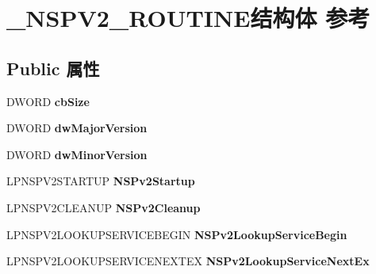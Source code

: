 \hypertarget{struct___n_s_p_v2___r_o_u_t_i_n_e}{}\section{\+\_\+\+N\+S\+P\+V2\+\_\+\+R\+O\+U\+T\+I\+N\+E结构体 参考}
\label{struct___n_s_p_v2___r_o_u_t_i_n_e}
\subsection*{Public 属性}
\begin{DoxyCompactItemize}
\item 
\mbox{\label{struct___n_s_p_v2___r_o_u_t_i_n_e_aafe88a730385e61a71c4a03383368849}} 
D\+W\+O\+RD {\bfseries cb\+Size}
\item 
\mbox{\label{struct___n_s_p_v2___r_o_u_t_i_n_e_a0ab9e8803d8e6dad01e350045e663df3}} 
D\+W\+O\+RD {\bfseries dw\+Major\+Version}
\item 
\mbox{\label{struct___n_s_p_v2___r_o_u_t_i_n_e_add448b1c3071c67d12e9fe834e958ad3}} 
D\+W\+O\+RD {\bfseries dw\+Minor\+Version}
\item 
\mbox{\label{struct___n_s_p_v2___r_o_u_t_i_n_e_affac485393d267295349378e0fc4fdf5}} 
L\+P\+N\+S\+P\+V2\+S\+T\+A\+R\+T\+UP {\bfseries N\+S\+Pv2\+Startup}
\item 
\mbox{\label{struct___n_s_p_v2___r_o_u_t_i_n_e_adaf12e9a4f58b9f37edda33e826f18d7}} 
L\+P\+N\+S\+P\+V2\+C\+L\+E\+A\+N\+UP {\bfseries N\+S\+Pv2\+Cleanup}
\item 
\mbox{\label{struct___n_s_p_v2___r_o_u_t_i_n_e_a9d6a8f99b429a5a5616d408ea8eac816}} 
L\+P\+N\+S\+P\+V2\+L\+O\+O\+K\+U\+P\+S\+E\+R\+V\+I\+C\+E\+B\+E\+G\+IN {\bfseries N\+S\+Pv2\+Lookup\+Service\+Begin}
\item 
\mbox{\label{struct___n_s_p_v2___r_o_u_t_i_n_e_a62312b8dbcb303e741c1137a85d5a9d4}} 
L\+P\+N\+S\+P\+V2\+L\+O\+O\+K\+U\+P\+S\+E\+R\+V\+I\+C\+E\+N\+E\+X\+T\+EX {\bfseries N\+S\+Pv2\+Lookup\+Service\+Next\+Ex}

\end{DoxyCompactItemize}
